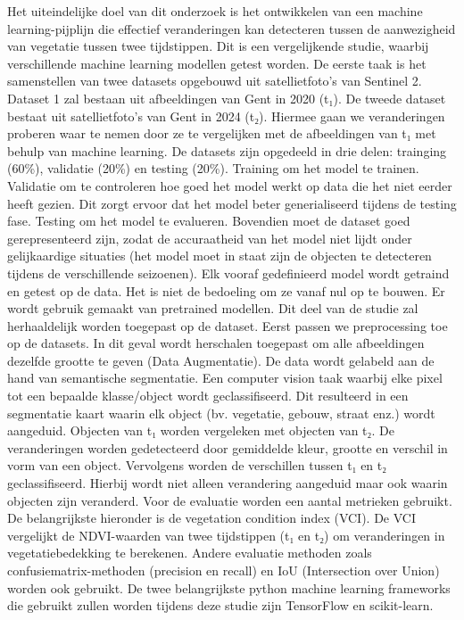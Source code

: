 Het uiteindelijke doel van dit onderzoek is het ontwikkelen van een machine learning-pijplijn die effectief veranderingen 
kan detecteren tussen de aanwezigheid van vegetatie tussen twee tijdstippen. Dit is een vergelijkende studie, 
waarbij verschillende machine learning modellen getest worden. 
De eerste taak is het samenstellen van twee datasets opgebouwd uit satellietfoto's van Sentinel 2. 
Dataset 1 zal bestaan uit afbeeldingen van Gent in 2020 (t₁).  
De tweede dataset bestaat uit satellietfoto's van Gent in 2024 (t₂). 
Hiermee gaan we veranderingen proberen waar te nemen door ze te vergelijken met de afbeeldingen van t₁ met behulp van machine learning.
De datasets zijn opgedeeld in drie delen: trainging (60\%), validatie (20\%) en testing (20\%).
Training om het model te trainen. Validatie om te controleren hoe goed het model werkt op data die het niet eerder heeft gezien. 
Dit zorgt ervoor dat het model beter generialiseerd tijdens de testing fase. Testing om het model te evalueren. 
Bovendien moet de dataset goed gerepresenteerd zijn, zodat de accuraatheid van het model niet lijdt onder gelijkaardige situaties 
(het model moet in staat zijn de objecten te detecteren tijdens de verschillende seizoenen).
Elk vooraf gedefinieerd model wordt getraind en getest op de data. Het is niet de bedoeling om ze vanaf nul op te bouwen. Er wordt 
gebruik gemaakt van pretrained modellen. Dit deel van de studie zal herhaaldelijk worden toegepast op de dataset. Eerst passen we 
preprocessing toe op de datasets. In dit geval wordt herschalen toegepast om alle afbeeldingen dezelfde grootte te geven (Data Augmentatie). 
De data wordt gelabeld aan de hand van semantische segmentatie. Een computer vision taak waarbij elke pixel tot een bepaalde klasse/object wordt 
geclassifiseerd. Dit resulteerd in een segmentatie kaart waarin elk object (bv. vegetatie, gebouw, straat enz.) wordt aangeduid. Objecten 
van t₁ worden vergeleken met objecten van t₂. De veranderingen worden gedetecteerd door gemiddelde kleur, grootte en 
verschil in vorm van een object. Vervolgens worden de verschillen tussen t₁ en t₂ geclassifiseerd. Hierbij wordt niet alleen 
verandering aangeduid maar ook waarin objecten zijn veranderd. Voor de evaluatie worden een aantal metrieken gebruikt. De belangrijkste 
hieronder is de vegetation condition index (VCI). De VCI vergelijkt de NDVI-waarden van twee tijdstippen (t₁ en t₂) om veranderingen 
in vegetatiebedekking te berekenen. Andere evaluatie methoden zoals confusiematrix-methoden (precision en recall) en IoU (Intersection over Union)
worden ook gebruikt. De twee belangrijkste python machine learning frameworks die gebruikt zullen worden tijdens deze studie zijn TensorFlow en scikit-learn.


